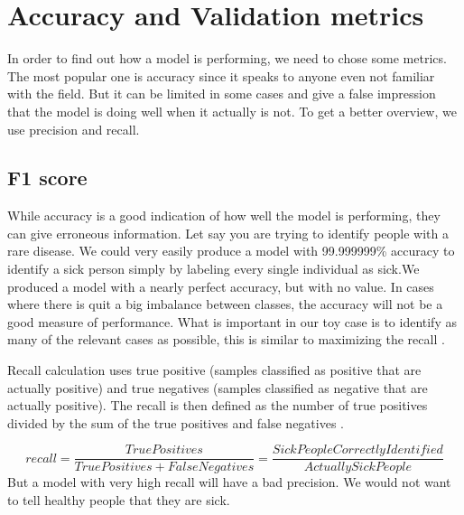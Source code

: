 \section{Accuracy and Validation metrics}
In order to find out how a model is performing, we need to chose some metrics. The most popular one is accuracy since it speaks to anyone even not familiar with the field. But it can be limited in some cases and give a false impression that the model is doing well when it actually is not. To get a better overview, we use precision and recall. 

\subsection{F1 score}
While accuracy is a good indication of how well the model is performing, they can give erroneous information. Let say you are trying to identify people with a rare disease. We could very easily produce a model with 99.999999\% accuracy to identify a sick person simply by labeling every single individual as sick.We produced a model with a nearly perfect accuracy, but with no value. In cases where there is quit a big imbalance between classes, the accuracy will not be a good measure of performance.
What is important in our toy case is to identify as many of the relevant cases as possible, this is similar to maximizing the recall \cite{multimetrics}. 

Recall calculation uses true positive (samples classified as positive that are actually positive) and true negatives (samples classified as negative that are actually positive). The recall is then defined as the number of true positives divided by the sum of the true positives and false negatives \cite{metrics}. 


\[recall = \frac{True Positives}{True Positives + False Negatives} = \frac{Sick People Correctly Identified}{Actually Sick People}\]
But a model with very high recall will have a bad precision. We would not want to tell healthy people that they are sick. 

